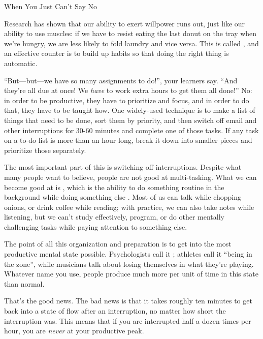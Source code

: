 \begin{callout}{When You Just Can't Say No}

  Research has shown that our ability to exert willpower runs out,
  just like our ability to use muscles: if we have to resist eating
  the last donut on the tray when we're hungry, we are less likely to
  fold laundry and vice versa.  This is called
   \cite{Mill2016a}, and an
  effective counter is to build up habits so that doing the right
  thing is automatic.

\end{callout}

``But---but---we have so many assignments to do!'', your learners say.
``And they're all due at once!  We \emph{have} to work extra hours to
get them all done!''  No: in order to be productive, they have to
prioritize and focus, and in order to do that, they have to be taught
how.  One widely-used technique is to make a list of things that need
to be done, sort them by priority, and then switch off email and other
interruptions for 30-60 minutes and complete one of those tasks.  If
any task on a to-do list is more than an hour long, break it down into
smaller pieces and prioritize those separately.

The most important part of this is switching off interruptions.
Despite what many people want to believe, people are not good at
multi-tasking.  What we can become good at is
, which is the ability to do
something routine in the background while doing something else
\cite{Mill2016a}.  Most of us can talk while chopping onions, or drink
coffee while reading; with practice, we can also take notes while
listening, but we can't study effectively, program, or do other
mentally challenging tasks while paying attention to something else.

The point of all this organization and preparation is to get into the
most productive mental state possible.  Psychologists call it
 \cite{Csik2008}; athletes call it ``being in
the zone'', while musicians talk about losing themselves in what
they're playing.  Whatever name you use, people produce much more per
unit of time in this state than normal.

That's the good news.  The bad news is that it takes roughly ten
minutes to get back into a state of flow after an interruption, no
matter how short the interruption was.  This means that if you are
interrupted half a dozen times per hour, you are \emph{never} at your
productive peak.

